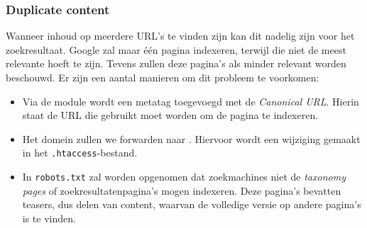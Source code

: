 \subsubsection{Duplicate content}
Wanneer inhoud op meerdere URL's te vinden zijn kan dit nadelig zijn voor het zoekresultaat. Google zal maar \'e\'en pagina indexeren, terwijl die niet de meest relevante hoeft te zijn. Tevens zullen deze pagina's als minder relevant worden beschouwd. Er zijn een aantal manieren om dit probleem te voorkomen:

\begin{itemize}
\item Via de  module wordt een metatag toegevoegd met de \textit{Canonical URL}. Hierin staat de URL die gebruikt moet worden om de pagina te indexeren.
\item Het domein \texttt{\customerdomain} zullen we forwarden naar \texttt{\customerdomainfull}. Hiervoor wordt een wijziging gemaakt in het \texttt{.htaccess}-bestand.

\item In \texttt{robots.txt} zal worden opgenomen dat zoekmachines niet de \textit{taxonomy pages} of zoekresultatenpagina's mogen indexeren. Deze pagina's bevatten teasers, dus delen van content, waarvan de volledige versie op andere pagina's is te vinden.
\end{itemize}

